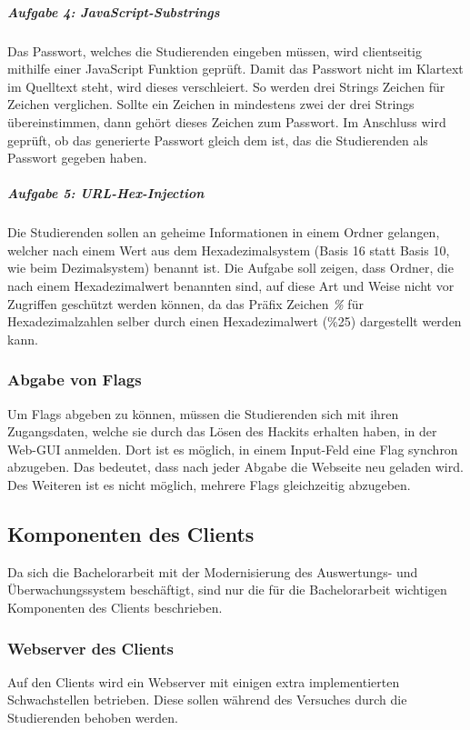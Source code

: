 \subparagraph{Aufgabe 4: JavaScript-Substrings}\label{subpara:Aufgabe_4_JavaScript-Substrings}
Das Passwort, welches die Studierenden eingeben müssen, wird clientseitig mithilfe einer JavaScript Funktion geprüft. Damit das Passwort nicht im Klartext im Quelltext steht, wird dieses verschleiert. So werden drei Strings Zeichen für Zeichen verglichen. Sollte ein Zeichen in mindestens zwei der drei Strings übereinstimmen, dann gehört dieses Zeichen zum Passwort. Im Anschluss wird geprüft, ob das generierte Passwort gleich dem ist, das die Studierenden als Passwort gegeben haben. \cite[S.20]{abtsUeberarbeitungUndErweiterung2016}

\subparagraph{Aufgabe 5: URL-Hex-Injection}\label{subpara:Aufgabe_5_URL-Hex-Injection}
Die Studierenden sollen an geheime Informationen in einem Ordner gelangen, welcher nach einem Wert aus dem Hexadezimalsystem (Basis 16 statt Basis 10, wie beim Dezimalsystem) benannt ist. Die Aufgabe soll zeigen, dass Ordner, die nach einem Hexadezimalwert benannten sind, auf diese Art und Weise nicht vor Zugriffen geschützt werden können, da das Präfix Zeichen \textit{\%} für Hexadezimalzahlen selber durch einen Hexadezimalwert (\%25) dargestellt werden kann. \cite[S.20]{abtsUeberarbeitungUndErweiterung2016}

\subsubsection{Abgabe von Flags}\label{subsubsec:Abgabe_von_Flags}
Um Flags abgeben zu können, müssen die Studierenden sich mit ihren Zugangsdaten, welche sie durch das Lösen des Hackits erhalten haben, in der Web-GUI anmelden. Dort ist es möglich, in einem Input-Feld eine Flag synchron abzugeben. Das bedeutet, dass nach jeder Abgabe die Webseite neu geladen wird. Des Weiteren ist es nicht möglich, mehrere Flags gleichzeitig abzugeben.

\subsection{Komponenten des Clients}\label{subsec:Komponente_des_Clients}
Da sich die Bachelorarbeit mit der Modernisierung des Auswertungs- und Überwachungssystem beschäftigt, sind nur die für die Bachelorarbeit wichtigen Komponenten des Clients beschrieben.

\subsubsection{Webserver des Clients}\label{subsubsec:Webserver_des_Clients}
Auf den Clients wird ein Webserver mit einigen extra implementierten Schwachstellen betrieben. Diese sollen während des Versuches durch die Studierenden behoben werden.

